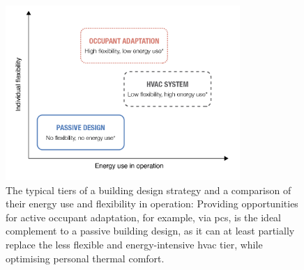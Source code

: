 \begin{figure}[h!]
    \centering
    \includegraphics[width=8.9cm]{manuscript/src/figures/energy-v-flexibility.png}
    \caption{The typical tiers of a building design strategy and a comparison of their energy use and flexibility in operation: Providing opportunities for active occupant adaptation, for example, via \gls{pcs}, is the ideal complement to a passive building design, as it can at least partially replace the less flexible and energy-intensive \gls{hvac} tier, while optimising personal thermal comfort.}
    \label{fig:energy-v-flexibility}
\end{figure}
